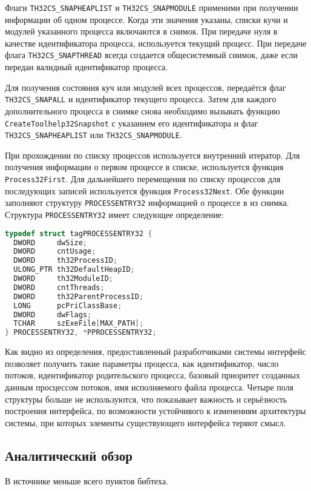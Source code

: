 Флаги \texttt{TH32CS\_SNAPHEAPLIST} и \texttt{TH32CS\_SNAPMODULE} применими при
получении информации об одном процессе. Когда эти значения указаны, списки кучи
и модулей указанного процесса включаются в снимок. При передаче нуля в качестве
идентификатора процесса, используется текущий процесс. При передаче флага
\texttt{TH32CS\_SNAPTHREAD} всегда создается общесистемный снимок, даже если
передан валидный идентификатор процесса.

Для получения состояния куч или модулей всех процессов, передаётся флаг
\texttt{TH32CS\_SNAPALL} и идентификатор текущего процесса. Затем для каждого
дополнительного процесса в снимке снова необходимо вызывать функцию
\texttt{CreateToolhelp32Snapshot} с указанием его идентификатора и флаг
\texttt{TH32CS\_SNAPHEAPLIST} или \texttt{TH32CS\_SNAPMODULE}.

При прохождении по списку процессов используется внутренний итератор. Для
получения информации о первом процессе в списке, используется функция
\texttt{Process32First}. Для дальнейшего перемещения по списку процессов для
последующих записей используется функция \texttt{Process32Next}. Обе функции
заполняют структуру \texttt{PROCESSENTRY32} информацией о процессе в из снимка.
Структура \texttt{PROCESSENTRY32} имеет следующее определение:

\bigskip
\begin{adjustwidth}{\fivecharsapprox}{}
\begin{lstlisting}[language=C, basicstyle=\small\ttfamily]
typedef struct tagPROCESSENTRY32 {
  DWORD     dwSize;
  DWORD     cntUsage;
  DWORD     th32ProcessID;
  ULONG_PTR th32DefaultHeapID;
  DWORD     th32ModuleID;
  DWORD     cntThreads;
  DWORD     th32ParentProcessID;
  LONG      pcPriClassBase;
  DWORD     dwFlags;
  TCHAR     szExeFile[MAX_PATH];
} PROCESSENTRY32, *PPROCESSENTRY32;
\end{lstlisting}
\end{adjustwidth}
\bigskip

Как видно из определения, предоставленный разработчиками системы интерфейс
позволяет получить такие параметры процесса, как идентификатор, число потоков,
идентификатор родительского процесса, базовый приоритет созданных данным
просцессом потоков, имя исполняемого файла процесса. Четыре поля структуры
больше не используются, что показывает важность и серьёзность построения
интерфейса, по возможности устойчивого к изменениям архитектуры системы, при
которых элементы существующего интерфейса теряют смысл.

\subsection{Аналитический обзор}
\label{sub:domain:analitic_overview}
В источнике \cite{kernel_docs} меньше всего пунктов бибтеха.

